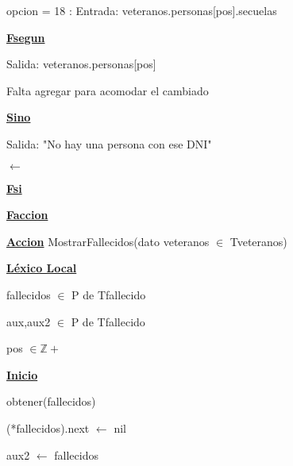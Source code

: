 \documentclass{article}
\begin{document}
                    \hspace{20mm}opcion = 18 : Entrada: veteranos.personas[pos].secuelas

                \hspace{16mm}\underline{\textbf{Fsegun}}
                
                \hspace{16mm}Salida: veteranos.personas[pos]

                \hspace{16mm}Falta agregar para acomodar el cambiado

            \hspace{12mm}\underline{\textbf{Sino}}

                \hspace{16mm}Salida: "No hay una persona con ese DNI"

                \hspace{16mm}$\leftarrow$

            \hspace{12mm}\underline{\textbf{Fsi}}

    \hspace{4mm}\underline{\textbf{Faccion}}

    \vspace{4mm}

    \hspace{4mm}\underline{\textbf{Accion}} MostrarFallecidos(dato veteranos $\in$ Tveteranos)

        \hspace{8mm}\underline{\textbf{Léxico Local}}

            \hspace{12mm}fallecidos $\in$ P de Tfallecido

            \hspace{12mm}aux,aux2 $\in$ P de Tfallecido

            \hspace{12mm}pos $\in \mathbb{Z}+$

        \hspace{8mm}\underline{\textbf{Inicio}}

            \hspace{12mm}obtener(fallecidos)

            \hspace{12mm}(*fallecidos).next $\leftarrow$ nil

            \hspace{12mm}aux2 $\leftarrow$ fallecidos
\end{document}

